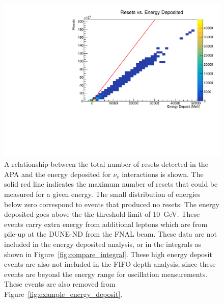 \begin{figure}[]
\centering
\includegraphics[width=\textwidth]{images/resets_vs_energy_deposit.pdf}
\caption{A relationship between the total number of resets detected in the APA and the energy deposited for $\nu_{e}$ interactions is shown.
The solid red line indicates the maximum number of resets that could be measured for a given energy.
The small distribution of energies below zero correspond to events that produced no resets.
The energy deposited goes above the the threshold limit of 10~\unit{GeV}.
These events carry extra energy from additional leptons which are from pile-up at the DUNE-ND from the FNAL beam.
These data are not included in the energy deposited analysis, or in the integrals as shown in Figure~\ref{fig:compare_integral}.
These high energy deposit events are also not included in the FIFO depth analysis, since these events are beyond the energy range for oscillation measurements.
These events are also removed from Figure~\ref{fig:example_energy_deposit}.
}
\end{figure}~\label{fig:energy_deposit_vs_resets}


